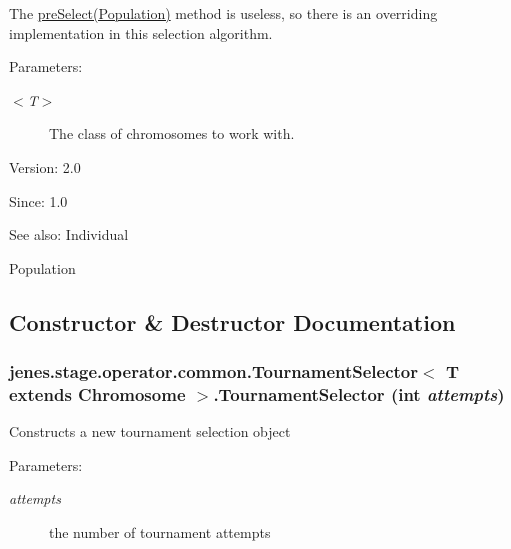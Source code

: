 The \hyperlink{}{preSelect(Population)} method is useless, so there is an overriding implementation in this selection algorithm. 

\begin{Desc}
\item[Parameters:]
\begin{description}
\item[{\em $<$T$>$}]The class of chromosomes to work with.\end{description}
\end{Desc}
\begin{Desc}
\item[Version:]2.0 \end{Desc}
\begin{Desc}
\item[Since:]1.0\end{Desc}
\begin{Desc}
\item[See also:]Individual 

Population \end{Desc}


\subsection{Constructor \& Destructor Documentation}
\hypertarget{classjenes_1_1stage_1_1operator_1_1common_1_1_tournament_selector_3_01_t_01extends_01_chromosome_01_4_69674739689660dc1926b06a43f2aa6d}{
\subsubsection[TournamentSelector]{\setlength{\rightskip}{0pt plus 5cm}jenes.stage.operator.common.TournamentSelector$<$ T extends Chromosome $>$.TournamentSelector (int {\em attempts})}}
\label{classjenes_1_1stage_1_1operator_1_1common_1_1_tournament_selector_3_01_t_01extends_01_chromosome_01_4_69674739689660dc1926b06a43f2aa6d}


Constructs a new tournament selection object 

\begin{Desc}
\item[Parameters:]
\begin{description}
\item[{\em attempts}]the number of tournament attempts \end{description}
\end{Desc}


